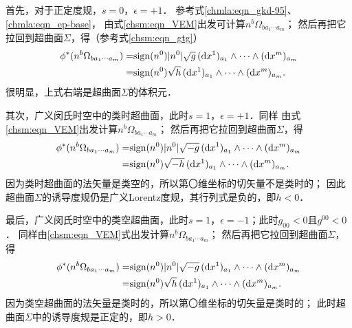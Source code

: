 首先，对于正定度规，$s=0$，$\epsilon=+1$．
参考式\eqref{chmla:eqn_gkd-95}、\eqref{chmla:eqn_ep-base}，
由式\eqref{chsm:eqn_VEM}出发可计算$n^b \Omega_{b a_1 \cdots a_m}$；
然后再把它拉回到超曲面$\Sigma$，得（参考式\eqref{chsm:eqn_gtg}）
\begin{equation}\label{chsm:eqn_induced-VE-positive}
\begin{aligned}
    \phi^*( n^b \Omega_{b a_1 \cdots a_m})=& {\rm sign}(n^0) |n^0| \sqrt{g}\,
     ({\rm d}x^1)_{a_1} \wedge \cdots \wedge({\rm d}x^m)_{a_m} \\
    =& {\rm sign}(n^0) \sqrt{h}\, ({\rm d}x^1)_{a_1} \wedge \cdots \wedge({\rm d}x^m)_{a_m}.
\end{aligned}
\end{equation}
很明显，上式右端是超曲面$\Sigma$的体积元．

其次，广义闵氏时空中的类时超曲面，此时$s=1$，$\epsilon=+1$．同样
由式\eqref{chsm:eqn_VEM}出发计算$n^b \Omega_{b a_1 \cdots a_m}$；
然后再把它拉回到超曲面$\Sigma$，得 %
\begin{equation}\label{chsm:eqn_induced-VE-TLHS}
\begin{aligned}
    \phi^*( n^b \Omega_{b a_1 \cdots a_m})=& {\rm sign}(n^0) |n^0| \sqrt{-g}\,
    ({\rm d}x^1)_{a_1} \wedge \cdots \wedge({\rm d}x^m)_{a_m} \\
    =&{\rm sign}(n^0) \sqrt{-h}\, ({\rm d}x^1)_{a_1} \wedge \cdots \wedge({\rm d}x^m)_{a_m}.
\end{aligned}
\end{equation}
因为类时超曲面的法矢量是类空的，所以第〇维坐标的切矢量不是类时的；
因此超曲面$\Sigma$的诱导度规仍是广义Lorentz度规，其行列式是负的，即$h<0$．

最后，广义闵氏时空中的类空超曲面，此时$s=1$，$\epsilon=-1$；此时$g_{00}<0$且$g^{00}<0$．
同样由\eqref{chsm:eqn_VEM}式出发计算$n^b \Omega_{b a_1 \cdots a_m}$；
然后再把它拉回到超曲面$\Sigma$，得 %
\begin{equation}\label{chsm:eqn_induced-VE-SLHS}
\begin{aligned}
    \phi^*( n^b \Omega_{b a_1 \cdots a_m})=& {\rm sign}(n^0) |n^0| \sqrt{-g}\,
      ({\rm d}x^1)_{a_1} \wedge \cdots \wedge({\rm d}x^m)_{a_m} \\
    =&{\rm sign}(n^0)\sqrt{h}\, ({\rm d}x^1)_{a_1} \wedge \cdots \wedge({\rm d}x^m)_{a_m}.
\end{aligned}
\end{equation}
因为类空超曲面的法矢量是类时的，所以第〇维坐标的切矢量是类时的；
此时超曲面$\Sigma$中的诱导度规是正定的，即$h>0$．

